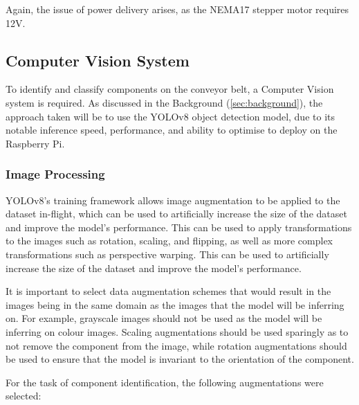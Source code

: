 Again, the issue of power delivery arises, as the NEMA17 stepper motor requires 12V.
\subsection{Computer Vision System}
\label{sec:computer-vision-system}
To identify and classify components on the conveyor belt, a Computer Vision system is required. As discussed in the Background (\autoref{sec:background}), the approach taken will be to use the YOLOv8 object detection model, due to its notable inference speed, performance, and ability to optimise to deploy on the Raspberry Pi.

\subsubsection{Image Processing}
\label{sec:image-processing}

YOLOv8's training framework \cite{yolov8} allows image augmentation to be applied to the dataset in-flight, which can be used to artificially increase the size of the dataset and improve the model's performance. This can be used to apply transformations to the images such as rotation, scaling, and flipping, as well as more complex transformations such as perspective warping. This can be used to artificially increase the size of the dataset and improve the model's performance.

It is important to select data augmentation schemes that would result in the images being in the same domain as the images that the model will be inferring on. For example, grayscale images should not be used as the model will be inferring on colour images. Scaling augmentations should be used sparingly as to not remove the component from the image, while rotation augmentations should be used to ensure that the model is invariant to the orientation of the component.

For the task of component identification, the following augmentations were selected:

